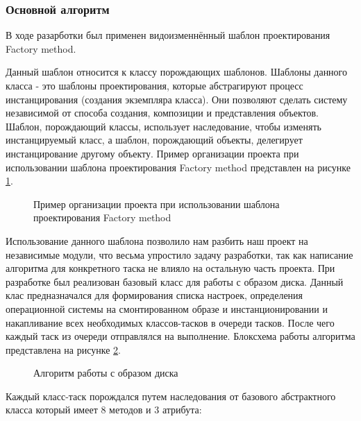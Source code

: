\subsubsection{Основной алгоритм}
В ходе разарботки был применен видоизменнённый шаблон проектирования Factory method.

Данный шаблон относится к классу порождающих шаблонов. Шаблоны данного класса - это шаблоны проектирования, которые абстрагируют процесс инстанцирования (создания экземпляра класса). Они позволяют сделать систему независимой от способа создания, композиции и представления объектов. Шаблон, порождающий классы, использует наследование, чтобы изменять инстанцируемый класс, а шаблон, порождающий объекты, делегирует инстанцирование другому объекту.
Пример организации проекта при использовании шаблона проектирования Factory method представлен на рисунке \ref{architech:architech}.

\begin{figure}[h!]
\caption{Пример организации проекта при использовании шаблона проектирования Factory method}
\label{architech:architech}
\end{figure}

Использование данного шаблона позволило нам разбить наш проект на независимые модули, что весьма упростило задачу разработки, так как написание алгоритма для конкретного таска не влияло на остальную часть проекта. При разработке был реализован базовый класс для работы с образом диска. Данный клас предназначался для формирования списка настроек, определения операционной системы на смонтированном образе и инстанционировании и накапливание всех необходимых классов-тасков в очереди тасков. После чего каждый таск из очереди отправлялся на выполнение. Блоксхема работы алгоритма представлена на рисунке \ref{alg_main:alg_main}.

\begin{figure}[h!]
\caption{Алгоритм работы с образом диска}
\label{alg_main:alg_main}
\end{figure}

Каждый класс-таск порождался путем наследования от базового абстрактного класса который имеет 8 методов и 3 атрибута:

